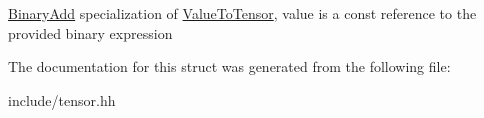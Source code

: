 \hyperlink{classtensor_1_1BinaryAdd}{Binary\+Add} specialization of \hyperlink{structtensor_1_1ValueToTensor}{Value\+To\+Tensor}, {\ttfamily value} is a const reference to the provided binary expression 

The documentation for this struct was generated from the following file\+:\begin{DoxyCompactItemize}
\item 
include/tensor.\+hh\end{DoxyCompactItemize}
